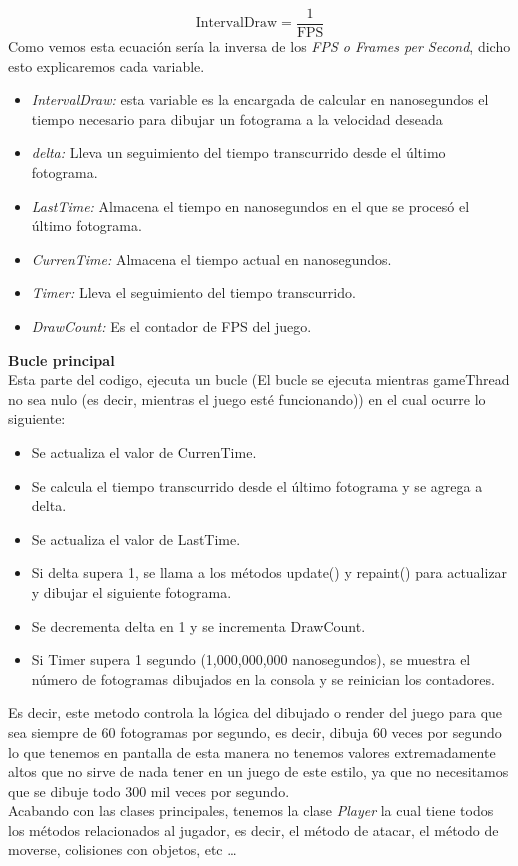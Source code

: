 \documentclass[a4paper]{article}
\begin{document}
$$\text{IntervalDraw} = \frac{1}{\text{FPS}}$$
Como vemos esta ecuación sería la inversa de los \textit{FPS o Frames per Second}, dicho esto explicaremos cada variable.
\begin{itemize}
    \item \textit{IntervalDraw:} esta variable es la encargada de calcular en nanosegundos el tiempo necesario para dibujar un fotograma a la velocidad deseada
    \item \textit{delta:} Lleva un seguimiento del tiempo transcurrido desde el último fotograma.
    \item \textit{LastTime:} Almacena el tiempo en nanosegundos en el que se procesó el último fotograma.
    \item \textit{CurrenTime:} Almacena el tiempo actual en nanosegundos.
    \item \textit{Timer:} Lleva el seguimiento del tiempo transcurrido.
    \item \textit{DrawCount:} Es el contador de FPS del juego.
\end{itemize}
\textbf{Bucle principal}\\
Esta parte del codigo, ejecuta un bucle (El bucle se ejecuta mientras gameThread no sea nulo (es decir, mientras el juego esté funcionando)) en el cual ocurre lo siguiente:
\begin{itemize}
    \item Se actualiza el valor de CurrenTime.
    \item Se calcula el tiempo transcurrido desde el último fotograma y se agrega a delta.
    \item Se actualiza el valor de LastTime.
    \item Si delta supera 1, se llama a los métodos update() y repaint() para actualizar y dibujar el siguiente fotograma.
    \item Se decrementa delta en 1 y se incrementa DrawCount.
    \item Si Timer supera 1 segundo (1,000,000,000 nanosegundos), se muestra el número de fotogramas dibujados en la consola y se reinician los contadores.
\end{itemize}
Es decir, este metodo controla la lógica del dibujado o render del juego para que sea siempre de 60 fotogramas por segundo, es decir, dibuja 60 veces por segundo lo que tenemos en pantalla
de esta manera no tenemos valores extremadamente altos que no sirve de nada tener en un juego de este estilo, ya que no necesitamos que se dibuje todo 300 mil veces por segundo.\\
Acabando con las clases principales, tenemos la clase \textit{Player} la cual tiene todos los métodos relacionados al jugador, es decir, el método de atacar, el método de moverse, colisiones con objetos,
etc \dots
\clearpage
\end{document}
